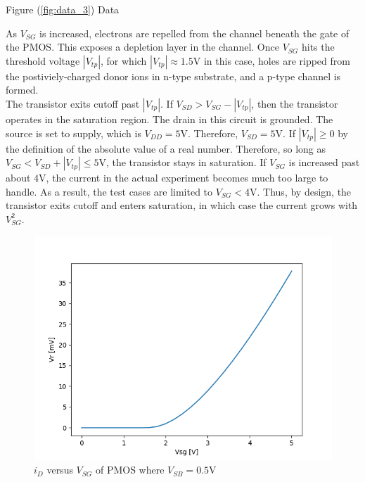 \FloatBarrier

\FloatBarrier

\begin{table}[h!]
	\centering
	\caption{Figure (\ref{fig:data_3}) Data}
	\label{tab:data_3}
\end{table}

\FloatBarrier

As $V_{SG}$ is increased, electrons are repelled from the channel beneath the gate of the PMOS.
This exposes a depletion layer in the channel.
Once $V_{SG}$ hits the threshold voltage $|V_{tp}|$, for which $|V_{tp}| \approx 1.5$\si{\volt} in this case, holes are ripped from the postiviely-charged donor ions in n-type substrate, and a p-type channel is formed. \\

The transistor exits cutoff past $|V_{tp}|$.
If $V_{SD} > V_{SG} - |V_{tp}|$, then the transistor operates in the saturation region.
The drain in this circuit is grounded.
The source is set to supply, which is $V_{DD} = 5$\si{\volt}.
Therefore, $V_{SD} = 5$\si{\volt}.
If $|V_{tp}| \geq 0$ by the definition of the absolute value of a real number.
Therefore, so long as $V_{SG} < V_{SD} + |V_{tp}| \leq 5$\si{\volt}, the transistor stays in saturation.
If $V_{SG}$ is increased past about $4$\si{\volt}, the current in the actual experiment becomes much too large to handle.
As a result, the test cases are limited to $V_{SG} < 4$\si{\volt}.
Thus, by design, the transistor exits cutoff and enters saturation, in which case the current grows with $V_{SG}^{2}$. \\

\FloatBarrier

\begin{figure}[h!]
	\centering
	\includegraphics[scale=0.75]{../images/data_3_b.PNG}
	\caption{$i_{D}$ versus $V_{SG}$ of PMOS where $V_{SB}= 0.5$\si{\volt}}
	\label{fig:data_3_b}
\end{figure}

